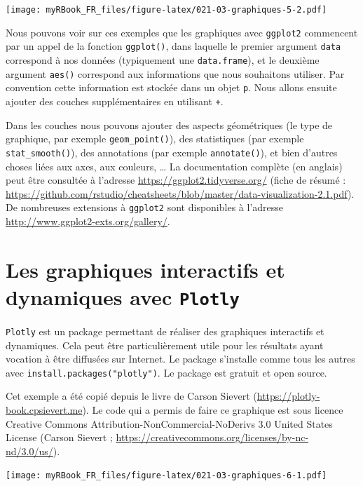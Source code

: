 \documentclass[]{book}
\begin{document}
\texttt{[image: myRBook\_FR\_files/figure-latex/021-03-graphiques-5-2.pdf]}

Nous pouvons voir sur ces exemples que les graphiques avec \texttt{ggplot2} commencent par un appel de la fonction \texttt{ggplot()}, dans laquelle le premier argument \texttt{data} correspond à nos données (typiquement une \texttt{data.frame}), et le deuxième argument \texttt{aes()} correspond aux informations que nous souhaitons utiliser. Par convention cette information est stockée dans un objet \texttt{p}. Nous allons ensuite ajouter des couches supplémentaires en utilisant \texttt{+}.

Dans les couches nous pouvons ajouter des aspects géométriques (le type de graphique, par exemple \texttt{geom\_point()}), des statistiques (par exemple \texttt{stat\_smooth()}), des annotations (par exemple \texttt{annotate()}), et bien d'autres choses liées aux axes, aux couleurs, \ldots{} La documentation complète (en anglais) peut être consultée à l'adresse \url{https://ggplot2.tidyverse.org/} (fiche de résumé : \url{https://github.com/rstudio/cheatsheets/blob/master/data-visualization-2.1.pdf}). De nombreuses extensions à \texttt{ggplot2} sont disponibles à l'adresse \url{http://www.ggplot2-exts.org/gallery/}.

\hypertarget{les-graphiques-interactifs-et-dynamiques-avec-plotly}{%
\section{\texorpdfstring{Les graphiques interactifs et dynamiques avec \texttt{Plotly}}{Les graphiques interactifs et dynamiques avec Plotly}}\label{les-graphiques-interactifs-et-dynamiques-avec-plotly}}

\texttt{Plotly} est un package permettant de réaliser des graphiques interactifs et dynamiques. Cela peut être particulièrement utile pour les résultats ayant vocation à être diffusées sur Internet. Le package s'installe comme tous les autres avec \texttt{install.packages("plotly")}. Le package est gratuit et open source.

Cet exemple a été copié depuis le livre de Carson Sievert (\url{https://plotly-book.cpsievert.me}). Le code qui a permis de faire ce graphique est sous licence Creative Commons Attribution-NonCommercial-NoDerivs 3.0 United States License (Carson Sievert ; \url{https://creativecommons.org/licenses/by-nc-nd/3.0/us/}).

\texttt{[image: myRBook\_FR\_files/figure-latex/021-03-graphiques-6-1.pdf]}
\end{document}
